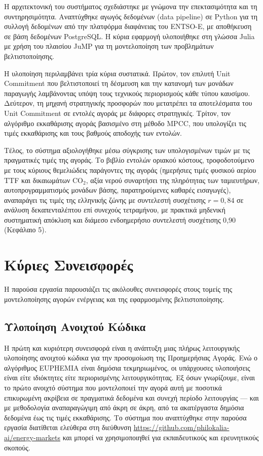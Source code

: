 Η αρχιτεκτονική του συστήματος σχεδιάστηκε με γνώμονα την επεκτασιμότητα και τη συντηρησιμότητα. Αναπτύχθηκε αγωγός δεδομένων (data pipeline) σε Python για τη συλλογή δεδομένων από την πλατφόρμα διαφάνειας του ENTSO-E, με αποθήκευση σε βάση δεδομένων PostgreSQL. Η κύρια εφαρμογή υλοποιήθηκε στη γλώσσα Julia με χρήση του πλαισίου JuMP για τη μοντελοποίηση των προβλημάτων βελτιστοποίησης.

Η υλοποίηση περιλαμβάνει τρία κύρια συστατικά. Πρώτον, τον επιλυτή Unit Commitment που βελτιστοποιεί τη δέσμευση και την κατανομή των μονάδων παραγωγής λαμβάνοντας υπόψη τους τεχνικούς περιορισμούς κάθε τύπου καυσίμου. Δεύτερον, τη μηχανή στρατηγικής προσφορών που μετατρέπει τα αποτελέσματα του Unit Commitment σε εντολές αγοράς με διάφορες στρατηγικές. Τρίτον, τον αλγόριθμο εκκαθάρισης αγοράς βασισμένο στη μέθοδο MPCC, που υπολογίζει τις τιμές εκκαθάρισης και τους βαθμούς αποδοχής των εντολών.

Τέλος, το σύστημα αξιολογήθηκε μέσω σύγκρισης των υπολογισμένων τιμών με τις πραγματικές τιμές της αγοράς. Το βιβλίο εντολών οριακού κόστους, τροφοδοτούμενο με τους κύριους θεμελιώδεις παράγοντες της αγοράς (ημερήσιες τιμές φυσικού αερίου TTF και δικαιωμάτων CO$_2$, αξία νερού συναρτήσει της πληρότητας των ταμιευτήρων, αυτοπρογραμματισμός μονάδων βάσης, παρατηρούμενες καθαρές εισαγωγές), αναπαράγει τις τιμές της ελληνικής ζώνης με συντελεστή συσχέτισης $r = 0{,}84$ σε ανάλυση δεκαπενταλέπτου επί συνεχούς τετραμήνου, με πρακτικά μηδενική συστηματική απόκλιση και διάμεσο ενδοημερήσιο συντελεστή συσχέτισης 0{,}90 (Κεφάλαιο 5).


\section{Κύριες Συνεισφορές}
\label{sec:contributions}

Η παρούσα εργασία παρουσιάζει τις ακόλουθες συνεισφορές στους τομείς της μοντελοποίησης αγορών ενέργειας και της εφαρμοσμένης βελτιστοποίησης.

\subsection{Υλοποίηση Ανοιχτού Κώδικα}
\label{subsec:open-source-contribution}

Η πρώτη και κυριότερη συνεισφορά είναι η ανάπτυξη μιας πλήρως λειτουργικής υλοποίησης ανοιχτού κώδικα για την προσομοίωση της Προημερήσιας Αγοράς. Ενώ ο αλγόριθμος EUPHEMIA είναι δημόσια τεκμηριωμένος, οι υπάρχουσες υλοποιήσεις είναι είτε ιδιόκτητες είτε περιορισμένης λειτουργικότητας. Εξ όσων γνωρίζουμε, είναι το πρώτο ανοιχτό σύστημα που μοντελοποιεί την αγορά αυτή με ποσοτικά επικυρωμένη ακρίβεια σε πραγματικά δεδομένα και συνεχή περίοδο λειτουργίας --- και με μεθοδολογία αναπαραγώγιμη από άκρη σε άκρη, από τα ακατέργαστα δημόσια δεδομένα έως τις τιμές εκκαθάρισης. Το σύστημα που αναπτύχθηκε στην παρούσα εργασία διατίθεται ελεύθερα στη διεύθυνση \url{https://github.com/philokalia-ai/energy-markets} και μπορεί να χρησιμοποιηθεί για εκπαιδευτικούς και ερευνητικούς σκοπούς.

